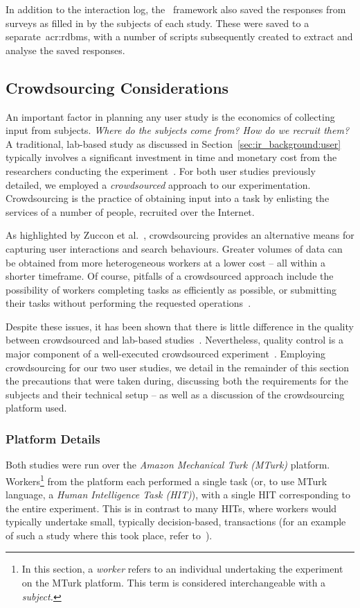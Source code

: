 In addition to the interaction log, the \treconomics~framework also saved the responses from surveys as filled in by the subjects of each study. These were saved to a separate~\gls{acr:rdbms}, with a number of scripts subsequently created to extract and analyse the saved responses.

\subsection{Crowdsourcing Considerations}\label{sec:csm:methodology:user:crowdsourcing}
An important factor in planning any user study is the economics of collecting input from subjects. \emph{Where do the subjects come from? How do we recruit them?} A traditional, lab-based study as discussed in Section~\ref{sec:ir_background:user} typically involves a significant investment in time and monetary cost from the researchers conducting the experiment~\citep{spool2001testing}. For both user studies previously detailed, we employed a \emph{crowdsourced} approach to our experimentation. Crowdsourcing is the practice of obtaining input into a task by enlisting the services of a number of people, recruited over the Internet.

As highlighted by Zuccon et al.~\cite{zuccon2013crowdsourcing_comparisons}, crowdsourcing provides an alternative means for capturing user interactions and search behaviours. Greater volumes of data can be obtained from more heterogeneous workers at a lower cost -- all within a shorter timeframe. Of course, pitfalls of a crowdsourced approach include the possibility of workers completing tasks as efficiently as possible, or submitting their tasks without performing the requested operations~\citep{feild2010turkers}.

Despite these issues, it has been shown that there is little difference in the quality between crowdsourced and lab-based studies~\cite{zuccon2013crowdsourcing_comparisons}. Nevertheless, quality control is a major component of a well-executed crowdsourced experiment~\cite{bota2016information_cards}. Employing crowdsourcing for our two user studies, we detail in the remainder of this section the precautions that were taken during, discussing both the requirements for the subjects and their technical setup -- as well as a discussion of the crowdsourcing platform used.

\subsubsection{Platform Details}
Both studies were run over the \emph{Amazon Mechanical Turk (MTurk)} platform. Workers\footnote{In this section, a \emph{worker} refers to an individual undertaking the experiment on the MTurk platform. This term is considered interchangeable with a \emph{subject.}} from the platform each performed a single task (or, to use MTurk language, a \emph{Human Intelligence Task (HIT)}), with a single HIT corresponding to the entire experiment. This is in contrast to many HITs, where workers would typically undertake small, typically decision-based, transactions (for an example of such a study where this took place, refer to~\cite{bota2016information_cards}).

